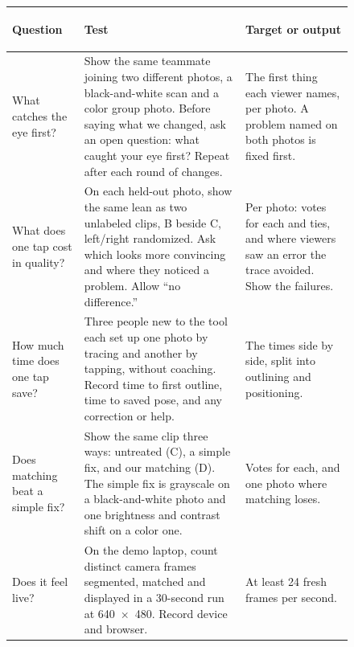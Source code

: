 \documentclass[10pt,letterpaper]{article}
\begin{document}
\begin{figure}[H]
\centering
\small
\begin{tabularx}{\textwidth}{@{}>{\bfseries\raggedright\arraybackslash}p{}>{\raggedright\arraybackslash}X>{\raggedright\arraybackslash}p{}@{}}
\toprule
Question & \textbf{Test} & \textbf{Target or output}\\
\midrule
What catches the eye first? & Show the same teammate joining two different photos, a black-and-white scan and a color group photo. Before saying what we changed, ask an open question: what caught your eye first? Repeat after each round of changes. & The first thing each viewer names, per photo. A problem named on both photos is fixed first.\\
\addlinespace
What does one tap cost in quality? & On each held-out photo, show the same lean as two unlabeled clips, B beside C, left/right randomized. Ask which looks more convincing and where they noticed a problem. Allow ``no difference.'' & Per photo: votes for each and ties, and where viewers saw an error the trace avoided. Show the failures.\\
\addlinespace
How much time does one tap save? & Three people new to the tool each set up one photo by tracing and another by tapping, without coaching. Record time to first outline, time to saved pose, and any correction or help. & The times side by side, split into outlining and positioning.\\
\addlinespace
Does matching beat a simple fix? & Show the same clip three ways: untreated (C), a simple fix, and our matching (D). The simple fix is grayscale on a black-and-white photo and one brightness and contrast shift on a color one. & Votes for each, and one photo where matching loses.\\
\addlinespace
Does it feel live? & On the demo laptop, count distinct camera frames segmented, matched and displayed in a 30-second run at 640~$\times$~480. Record device and browser. & At least 24 fresh frames per second.\\
\bottomrule
\end{tabularx}


\end{figure}
\end{document}
